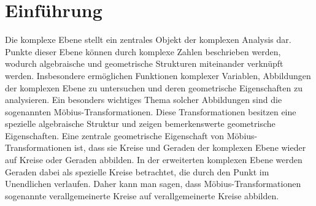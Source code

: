 %
%
%
%
\section{Einführung\label{moebius:section:teil0}}

Die komplexe Ebene stellt ein zentrales Objekt der komplexen Analysis dar. 
%
Punkte dieser Ebene können durch komplexe Zahlen beschrieben werden, wodurch algebraische und geometrische Strukturen miteinander verknüpft werden. 
Insbesondere ermöglichen Funktionen komplexer Variablen, Abbildungen der komplexen Ebene zu untersuchen und deren geometrische Eigenschaften zu analysieren.
Ein besonders wichtiges Thema solcher Abbildungen sind die sogenannten Möbius-Transformationen. 
%
Diese Transformationen besitzen eine spezielle algebraische Struktur und zeigen bemerkenswerte geometrische Eigenschaften. 
Eine zentrale geometrische Eigenschaft von Möbius-Transformationen ist, dass sie Kreise und Geraden der komplexen Ebene wieder auf Kreise oder Geraden abbilden.
In der erweiterten komplexen Ebene werden Geraden dabei als spezielle Kreise betrachtet, die durch den Punkt im Unendlichen verlaufen. 
%
Daher kann man sagen, dass Möbius-Transformationen sogenannte verallgemeinerte Kreise auf verallgemeinerte Kreise abbilden.



